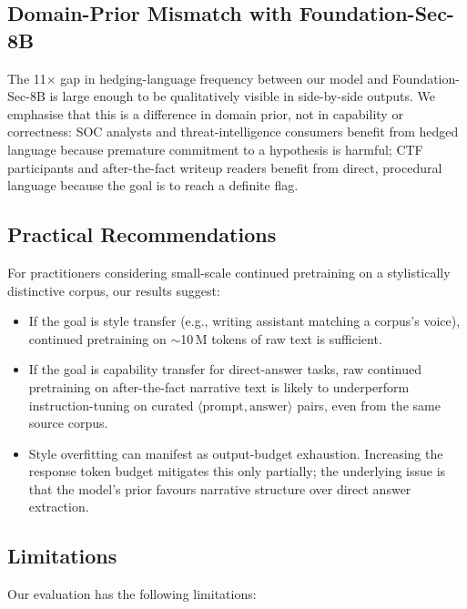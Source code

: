 \documentclass[10pt,twocolumn,a4paper]{article}
\begin{document}
\subsection{Domain-Prior Mismatch with Foundation-Sec-8B}

The 11$\times$ gap in hedging-language frequency between our model and Foundation-Sec-8B is large enough to be qualitatively visible in side-by-side outputs. We emphasise that this is a difference in domain prior, not in capability or correctness: SOC analysts and threat-intelligence consumers benefit from hedged language because premature commitment to a hypothesis is harmful; CTF participants and after-the-fact writeup readers benefit from direct, procedural language because the goal is to reach a definite flag.

\subsection{Practical Recommendations}

For practitioners considering small-scale continued pretraining on a stylistically distinctive corpus, our results suggest:

\begin{itemize}
\item If the goal is style transfer (e.g., writing assistant matching a corpus's voice), continued pretraining on $\sim$10\,M tokens of raw text is sufficient.
\item If the goal is capability transfer for direct-answer tasks, raw continued pretraining on after-the-fact narrative text is likely to underperform instruction-tuning on curated $\langle\text{prompt}, \text{answer}\rangle$ pairs, even from the same source corpus.
\item Style overfitting can manifest as output-budget exhaustion. Increasing the response token budget mitigates this only partially; the underlying issue is that the model's prior favours narrative structure over direct answer extraction.
\end{itemize}

\subsection{Limitations}

Our evaluation has the following limitations:
\end{document}
